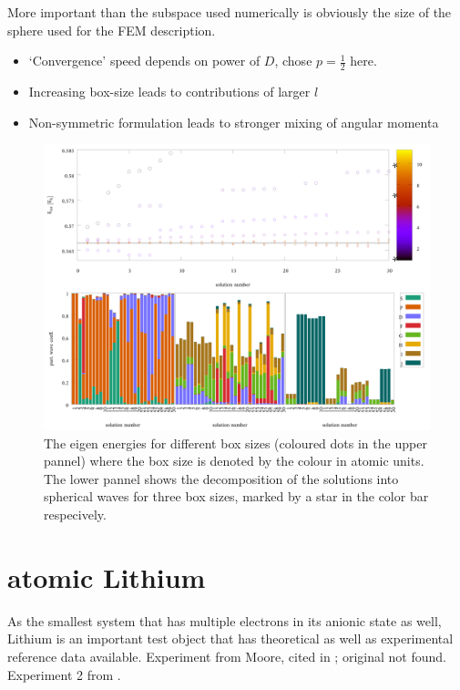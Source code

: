 More important than the subspace used numerically is obviously the size of the sphere used for the FEM description.
\begin{itemize}
   \item `Convergence' speed depends on power of $D$, chose $p=\frac 12$ here.
   \item Increasing box-size leads to contributions of larger $l$ 
   \item Non-symmetric formulation leads to stronger mixing of angular momenta
\end{itemize}
\begin{figure}
\includegraphics[width=\textwidth]{Figures/RadWaves_p0_5.pdf}
\caption{The eigen energies for different box sizes (coloured dots in the upper pannel) where the box size is denoted by the colour in atomic units.
The lower pannel shows the decomposition of the solutions into spherical waves for three box sizes, marked by a star in the color bar respecively.}
\label{fig:RadWaves}
\end{figure}

\section{atomic Lithium}
As the smallest system that has multiple electrons in its anionic state as well, Lithium is an important
test object that has theoretical as well as experimental reference data available\cite{Li-R,Li-R1, LiNaRef1}.
Experiment from Moore, cited in \cite{LiNaRef1}; original not found.
Experiment 2 from \cite{LiSonntag}.

